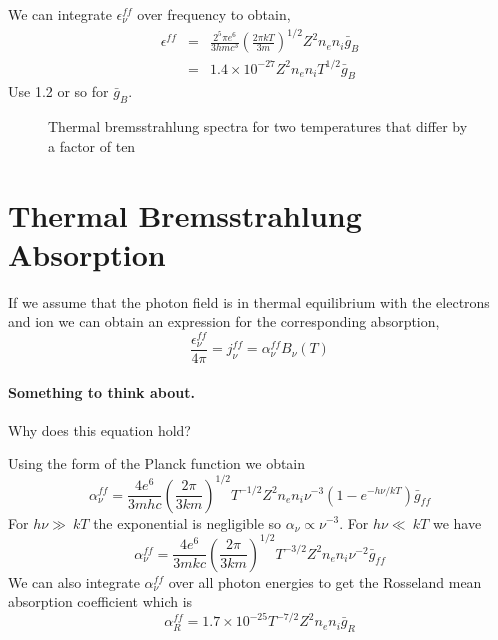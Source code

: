 We can integrate $\epsilon_\nu^{ff}$ over frequency to obtain,
\begin{eqnarray}
\epsilon^{ff} &=& \frac{2^5 \pi
  e^6}{3 h m c^3} \left ( \frac{2\pi k T}{3m} \right )^{1/2} Z^2
  n_e n_i {\bar g}_{B} \\
&=& 1.4 \times 10^{-27} Z^2 n_e n_i T^{1/2} {\bar g}_{B}
\label{eq:342}
\end{eqnarray}
Use 1.2 or so for ${\bar g}_{B}$.
\begin{figure}
\centering
{}
\caption{Thermal bremsstrahlung spectra for two temperatures that
  differ by a factor of ten }
\end{figure}
\section{Thermal Bremsstrahlung Absorption}
\label{sec:therm-bremsstr-absor}
If we assume that the photon field is in thermal equilibrium with the
electrons and ion we can obtain an expression for the corresponding
absorption,
\begin{equation}
\frac{\epsilon^{ff}_\nu}{4\pi} = j^{ff}_\nu = \alpha_\nu^{ff} B_\nu (T)
\label{eq:343}
\end{equation}
\paragraph{Something to think about.}  Why does this equation hold?

Using the form of the Planck function we obtain
\begin{equation}
\alpha_{\nu}^{ff} = \frac{4 e^6}{3m h c} 
\left ( \frac{2\pi}{3km} \right )^{1/2} T^{-1/2} Z^2
  n_e n_i \nu^{-3} \left ( 1  - e^{-h\nu/kT} \right ) {\bar g}_{ff}
\label{eq:344}
\end{equation}
For $h\nu \gg\ k T$ the exponential is negligible so $\alpha_\nu
\propto \nu^{-3}$.  For $h\nu \ll\ k T$ we have
\begin{equation}
\alpha_{\nu}^{ff} = \frac{4 e^6}{3m k c} 
\left ( \frac{2\pi}{3km} \right )^{1/2} T^{-3/2} Z^2
  n_e n_i \nu^{-2} {\bar g}_{ff}
\label{eq:345}
\end{equation}
We can also integrate $\alpha_\nu^{ff}$ over all photon energies to 
get the Rosseland mean absorption coefficient which is 
\begin{equation}
\alpha_R^{ff} = 1.7 \times 10^{-25} T^{-7/2} Z^2 n_e n_i {\bar g}_R
\label{eq:346}
\end{equation}

